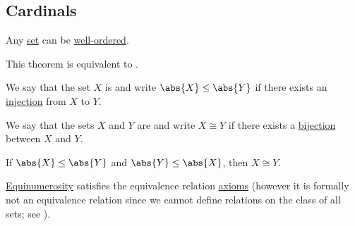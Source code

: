 \subsection{Cardinals}\label{subsec:cardinals}

\begin{theorem}\label{thm:well_ordering_principle}
  Any \hyperref[def:set]{set} can be \hyperref[def:well_ordered_set]{well-ordered}.

  This theorem is equivalent to .
\end{theorem}

\begin{definition}\label{def:set_domination}
  We say that the set \( X \) is  and write \( \abs{X} \leq \abs{Y} \) if there exists an \hyperref[def:function_invertibility/injection]{injection} from \( X \) to \( Y \).
\end{definition}

\begin{definition}\label{def:equinumerous_sets}
  We say that the sets \( X \) and \( Y \) are  and write \( X \cong Y \) if there exists a \hyperref[def:function_invertibility/bijection]{bijection} between \( X \) and \( Y \).
\end{definition}

\begin{theorem}\label{thm:cantor_schroder_bernstein}
  If \( \abs{X} \leq \abs{Y} \) and \( \abs{Y} \leq \abs{X} \), then \( X \cong Y \).
\end{theorem}

\medskip

\begin{proposition}\label{thm:equinumerousity_equivalence}
  \hyperref[def:equinumerous_sets]{Equinumerosity} satisfies the equivalence relation \hyperref[def:equivalence_relation]{axioms} (however it is formally not an equivalence relation since we cannot define relations on the class of all sets; see ).
\end{proposition}

